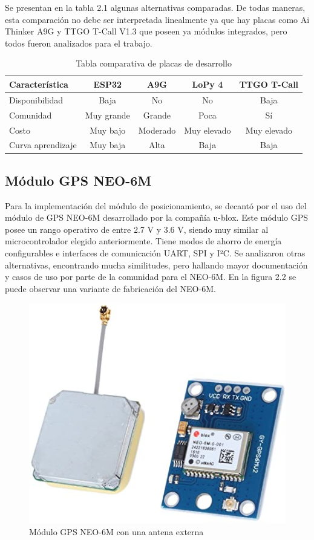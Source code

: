 Se presentan en la tabla 2.1 algunas alternativas comparadas. De todas maneras, esta comparación no debe ser interpretada linealmente ya que hay placas como Ai Thinker A9G y TTGO T-Call V1.3 que poseen ya módulos integrados, pero todos fueron analizados para el trabajo.

\begin{table}[h]
	\centering
	\caption[Tabla comparativa]{Tabla comparativa de placas de desarrollo}
	\begin{tabular}{l c c c c}    
		\toprule
		\textbf{Característica} 	 & \textbf{ESP32} & \textbf{A9G} & \textbf{LoPy 4} & \textbf{TTGO T-Call}  \\
		\midrule
		Disponibilidad & Baja & No & No & Baja			\\		
		Comunidad & Muy grande & Grande & Poca & Sí			\\
		Costo & Muy bajo & Moderado & Muy elevado & Muy elevado		\\
		Curva aprendizaje & Muy baja & Alta & Baja & Baja \\
		\bottomrule
		\hline
	\end{tabular}
	\label{tab:peces}
\end{table}

\subsection{Módulo GPS NEO-6M}

Para la implementación del módulo de posicionamiento, se decantó por el uso del módulo de GPS NEO-6M desarrollado por la compañía u-blox. Este módulo GPS posee un rango operativo de entre 2.7 V y 3.6 V, siendo muy similar al microcontrolador elegido anteriormente. Tiene modos de ahorro de energía configurables e interfaces de comunicación UART, SPI y I²C\citep{NEO6M:1}. Se analizaron otras alternativas, encontrando mucha similitudes, pero hallando mayor documentación y casos de uso por parte de la comunidad para el NEO-6M. En la figura 2.2 se puede observar una variante de fabricación del NEO-6M.

\begin{figure}[H]
	\centering
	\includegraphics[width=.6\textwidth]{./Figures/neo-6m.jpg}
	\caption{Módulo GPS NEO-6M con una antena externa}
	\label{fig:texmaker}
\end{figure}

